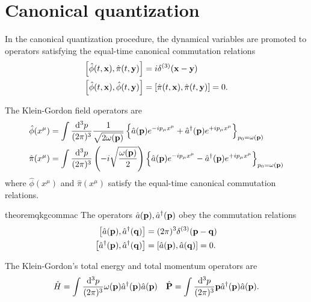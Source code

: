 \section{Canonical quantization}

\begin{definition}
	In the canonical quantization procedure, the dynamical variables are promoted to operators satisfying the equal-time canonical commutation relations
	\begin{align}
		\comm{\hat\phi(t,\vb{x})}{\hat\pi(t,\vb{y})}
		&=
		i\delta^{(3)}(\vb{x}-\vb{y})
		\\
		\comm{\hat\phi(t,\vb{x})}{\hat\phi(t,\vb{y})}
		&=
		\comm{\hat\pi(t,\vb{x})}{\hat\pi(t,\vb{y})}
		=
		0
		\label{eq:qkg_comm_pm}
		.
	\end{align}
\end{definition}
\begin{corollary}
	The Klein-Gordon field operators are
	\begin{align}
		\hat\phi(x^\mu)
		&=
		\int\frac{\dd[3]{p}}{(2\pi)^3}
		\frac{1}{\sqrt{2\omega(\vb{p})}}
		\left\{
			\hat{a}(\vb{p})
			e^{-ip_\mu x^\mu}
			+
			\hat{a}^\dagger(\vb{p})
			e^{+ip_\mu x^\mu}
		\right\}_{p_0=\omega(\vb{p})}
		\label{eq:qkg_pos}
		\\
		\hat\pi(x^\mu)
		&=
		\int\frac{\dd[3]{p}}{(2\pi)^3}
		\left(-i\sqrt{\frac{\omega(\vb{p})}{2}}\right)
		\left\{
			\hat{a}(\vb{p})
			e^{-ip_\mu x^\mu}
			-
			\hat{a}^\dagger(\vb{p})
			e^{+ip_\mu x^\mu}
		\right\}_{p_0=\omega(\vb{p})}
		\label{eq:qkg_mom}
	\end{align}
	where $\hat\phi(x^\mu)$ and $\hat\pi(x^\mu)$ satisfy the equal-time canonical commutation relations.
\end{corollary}
\begin{restatable}{theorem}{qkgcommac}\label{thm:qkg_comm_ac}
	The operators $\hat{a}(\vb{p}),\hat{a}^\dagger(\vb{p})$ obey the commutation relations
	\begin{align}
		\comm{\hat{a}(\vb{p})}{\hat{a}^\dagger(\vb{q})}
		&=
		(2\pi)^3
		\delta^{(3)}(\vb{p}-\vb{q})
		\\
		\comm{\hat{a}^\dagger(\vb{p})}{\hat{a}^\dagger(\vb{q})}
		&=
		\comm{\hat{a}(\vb{p})}{\hat{a}(\vb{q})}
		=
		0
		\label{eq:kg_comm_ac}
		.
	\end{align}	
\end{restatable}
\begin{definition}\label{def:qkg_energy_momentum}
	The Klein-Gordon's total energy and total momentum operators are
	\begin{align}
		\hat{H}
		=
		\int\frac{\dd[3]{p}}{(2\pi)^3}
		\omega(\vb{p})\hat{a}^\dagger(\vb{p})\hat{a}(\vb{p})
		&&
		\hat{\vb{P}}
		=
		\int\frac{\dd[3]{p}}{(2\pi)^3}
		\vb{p}\hat{a}^\dagger(\vb{p})\hat{a}(\vb{p})
		\label{eq:qkg_energy_momentum}
		.
	\end{align}
\end{definition}
